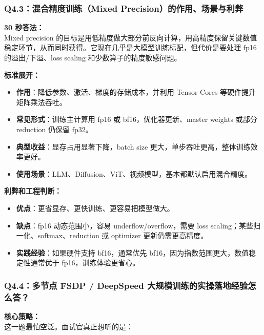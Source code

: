 \subsubsection{Q4.3：混合精度训练（Mixed Precision）的作用、场景与利弊}

\begin{conceptbox}
\textbf{30 秒答法：}\\
Mixed precision 的目标是用低精度做大部分前反向计算，用高精度保留关键数值稳定环节，从而同时获得。它现在几乎是大模型训练标配，但代价是要处理 fp16 的溢出/下溢、loss scaling 和少数算子的精度敏感问题。
\end{conceptbox}

\textbf{标准展开：}
\begin{itemize}[leftmargin=1.5em]
  \item \textbf{作用}：降低参数、激活、梯度的存储成本，并利用 Tensor Cores 等硬件提升矩阵乘法吞吐。
  \item \textbf{常见形式}：训练主计算用 fp16 或 bf16，优化器更新、master weights 或部分 reduction 仍保留 fp32。
  \item \textbf{典型收益}：显存占用显著下降，batch size 更大，单步吞吐更高，整体训练效率更好。
  \item \textbf{使用场景}：LLM、Diffusion、ViT、视频模型，基本都默认启用混合精度。
\end{itemize}

\textbf{利弊和工程判断：}
\begin{itemize}[leftmargin=1.5em]
  \item \textbf{优点}：更省显存、更快训练、更容易把模型做大。
  \item \textbf{缺点}：fp16 动态范围小，容易 underflow/overflow，需要 loss scaling；某些归一化、softmax、reduction 或 optimizer 更新仍需更高精度。
  \item \textbf{实践经验}：如果硬件支持 bf16，通常优先 bf16，因为指数范围更大，数值稳定性通常优于 fp16，训练体验更省心。
\end{itemize}

\subsubsection{Q4.4：多节点 FSDP / DeepSpeed 大规模训练的实操落地经验怎么答？}

\begin{conceptbox}
\textbf{核心策略：}\\
这一题最怕空泛。面试官真正想听的是：
\end{conceptbox}

